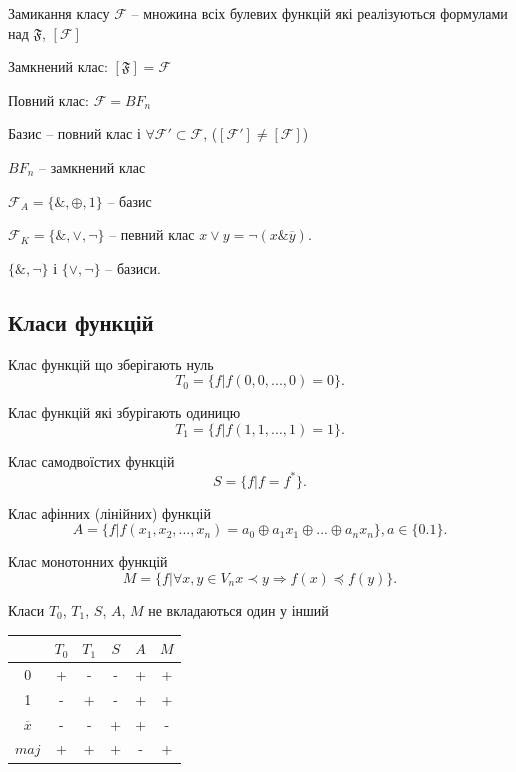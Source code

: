 Замикання класу $\mathcal{F}$ -- множина всіх булевих функцій які реалізуються формулами над $\mathfrak{F}$, $[\mathcal{F}]$

Замкнений клас: $[\mathfrak{F}] = \mathcal{F}$

Повний клас: ${\mathcal{F}} = BF_n$

Базис -- повний клас і $\forall \mathcal{F}' \subset \mathcal{F}$, ($[\mathcal{F}'] \neq [\mathcal{F}]$)

$BF_n$ -- замкнений клас

$\mathcal{F}_A = \{\&, \oplus, 1\}$ -- базис

$\mathcal{F}_K = \{\&, \vee, \neg\}$ -- певний клас $x \vee y = \neg (x \& \overline{y})$.

$\{\&, \neg\}$ і $\{\vee, \neg\}$ -- базиси.

\subsection{Класи функцій}

Клас функцій що зберігають нуль
\begin{equation*}
    T_0 = \{f | f(0, 0, ..., 0) = 0\}.
\end{equation*}

Клас функцій які збурігають одиницю
\begin{equation*}
    T_1 = \{f | f(1, 1, ..., 1) = 1\}.
\end{equation*}

Клас самодвоїстих функцій
\begin{equation*}
    S = \{f | f = f^*\}.
\end{equation*}

Клас афінних (лінійних) функцій
\begin{equation*}
    A = \{f | f(x_1, x_2, ..., x_n) = a_0 \oplus a_1 x_1 \oplus ... \oplus a_n x_n\}, a \in \{0. 1\}.
\end{equation*}

Клас монотонних функцій
\begin{equation*}
    M = \{f | \forall x, y \in V_n x \prec y \Rightarrow f(x) \preceq f(y)\}.
\end{equation*}

\begin{lemma}
    Класи $T_0$, $T_1$, $S$, $A$, $M$ не вкладаються один у інший
\end{lemma}

\begin{example}
    \begin{tabular}{c|c|c|c|c|c}
        & $T_0$ & $T_1$ & $S$ & $A$ & $M$ \\\hline
        0 & + & - & - & + & + \\\hline
        1 & - & + & - & + & + \\\hline
        $\overline{x}$ & - & - & + & + & - \\\hline
        $maj$ & + & + & + & - & + \\
    \end{tabular}
\end{example}

